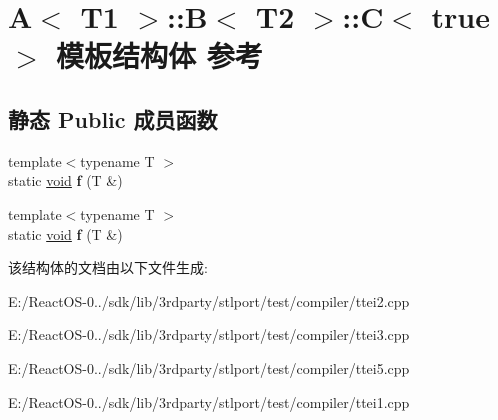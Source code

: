 \hypertarget{struct_a_1_1_b_1_1_c_3_01true_01_4}{}\section{A$<$ T1 $>$\+:\+:B$<$ T2 $>$\+:\+:C$<$ true $>$ 模板结构体 参考}
\label{struct_a_1_1_b_1_1_c_3_01true_01_4}
\subsection*{静态 Public 成员函数}
\begin{DoxyCompactItemize}
\item 
\mbox{\label{struct_a_1_1_b_1_1_c_3_01true_01_4_a65d1abc0fedd8e76244be3e59050d28a}} 
{\footnotesize template$<$typename T $>$ }\\static \hyperlink{interfacevoid}{void} {\bfseries f} (T \&)
\item 
\mbox{\label{struct_a_1_1_b_1_1_c_3_01true_01_4_a7ccc645be40e28ab058b17e60b204de2}} 
{\footnotesize template$<$typename T $>$ }\\static \hyperlink{interfacevoid}{void} {\bfseries f} (T \&)
\end{DoxyCompactItemize}


该结构体的文档由以下文件生成\+:\begin{DoxyCompactItemize}
\item 
E\+:/\+React\+O\+S-\/0../sdk/lib/3rdparty/stlport/test/compiler/ttei2.\+cpp\item 
E\+:/\+React\+O\+S-\/0../sdk/lib/3rdparty/stlport/test/compiler/ttei3.\+cpp\item 
E\+:/\+React\+O\+S-\/0../sdk/lib/3rdparty/stlport/test/compiler/ttei5.\+cpp\item 
E\+:/\+React\+O\+S-\/0../sdk/lib/3rdparty/stlport/test/compiler/ttei1.\+cpp\end{DoxyCompactItemize}
